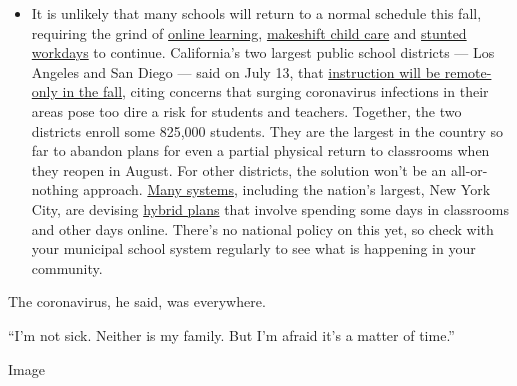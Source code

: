\begin{itemize}
  \begin{itemize}
  \tightlist
  \item
    It is unlikely that many schools will return to a normal schedule
    this fall, requiring the grind of
    \href{https://www.nytimes.com/2020/06/05/us/coronavirus-education-lost-learning.html?action=click\&pgtype=Article\&state=default\&region=MAIN_CONTENT_3\&context=storylines_faq}{online
    learning},
    \href{https://www.nytimes.com/2020/05/29/us/coronavirus-child-care-centers.html?action=click\&pgtype=Article\&state=default\&region=MAIN_CONTENT_3\&context=storylines_faq}{makeshift
    child care} and
    \href{https://www.nytimes.com/2020/06/03/business/economy/coronavirus-working-women.html?action=click\&pgtype=Article\&state=default\&region=MAIN_CONTENT_3\&context=storylines_faq}{stunted
    workdays} to continue. California's two largest public school
    districts --- Los Angeles and San Diego --- said on July 13, that
    \href{https://www.nytimes.com/2020/07/13/us/lausd-san-diego-school-reopening.html?action=click\&pgtype=Article\&state=default\&region=MAIN_CONTENT_3\&context=storylines_faq}{instruction
    will be remote-only in the fall}, citing concerns that surging
    coronavirus infections in their areas pose too dire a risk for
    students and teachers. Together, the two districts enroll some
    825,000 students. They are the largest in the country so far to
    abandon plans for even a partial physical return to classrooms when
    they reopen in August. For other districts, the solution won't be an
    all-or-nothing approach.
    \href{https://bioethics.jhu.edu/research-and-outreach/projects/eschool-initiative/school-policy-tracker/}{Many
    systems}, including the nation's largest, New York City, are
    devising
    \href{https://www.nytimes.com/2020/06/26/us/coronavirus-schools-reopen-fall.html?action=click\&pgtype=Article\&state=default\&region=MAIN_CONTENT_3\&context=storylines_faq}{hybrid
    plans} that involve spending some days in classrooms and other days
    online. There's no national policy on this yet, so check with your
    municipal school system regularly to see what is happening in your
    community.
  \end{itemize}
\end{itemize}

The coronavirus, he said, was everywhere.

``I'm not sick. Neither is my family. But I'm afraid it's a matter of
time.''

Image

